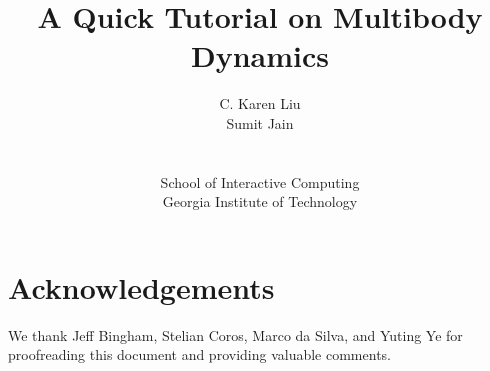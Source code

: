 \documentclass[12pt, letterpaper, onecolumn]{article}
\title{A Quick Tutorial on Multibody Dynamics}
\author{{C. Karen Liu} \\
{Sumit Jain} \\ \\ \\
{School of Interactive Computing}\\
{Georgia Institute of Technology} 
}
\begin{document}
%
\date{}
\maketitle

\newpage

\tableofcontents
{}
\newpage
%

\newpage

\newpage

\newpage

\newpage

\newpage

\newpage


\section*{Acknowledgements}
{
We thank Jeff Bingham, Stelian Coros, Marco da Silva, and Yuting Ye for
proofreading this document and providing valuable comments.
}
{
%

}
\end{document}
